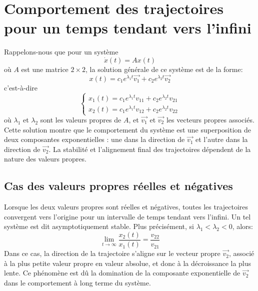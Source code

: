     \section{Comportement des trajectoires pour un temps tendant vers l'infini}
        Rappelons-nous que pour un système
        \begin{equation}
            \dot{x}(t) = A x(t)
        \end{equation}
        où $A$ est une matrice $2 \times 2$, la solution générale de ce système est de la forme: 
        \begin{equation}
            x(t) = c_1 e^{\lambda_1 t} \overrightarrow{v_1} + c_2 e^{\lambda_2 t} \overrightarrow{v_2}
        \end{equation}
        c'est-à-dire
        \begin{equation}
            \begin{cases}
                x_1(t) = c_1 e^{\lambda_1 t} v_{11} + c_2 e^{\lambda_2 t} v_{21} \\
                x_2(t) = c_1 e^{\lambda_1 t} v_{12} + c_2 e^{\lambda_2 t} v_{22}
            \end{cases}
        \end{equation}
        où $\lambda_1$ et $\lambda_2$ sont les valeurs propres de $A$, et $\overrightarrow{v_1}$ et $\overrightarrow{v_2}$ les vecteurs propres associés. Cette solution montre que le comportement du système est une superposition de deux composantes exponentielles : une dans la direction de $\overrightarrow{v_1}$ et l'autre dans la direction de $\overrightarrow{v_2}$. La stabilité et l’alignement final des trajectoires dépendent de la nature des valeurs propres.

        \subsection{Cas des valeurs propres réelles et négatives}
            Lorsque les deux valeurs propres sont réelles et négatives, toutes les trajectoires convergent vers l'origine pour un intervalle de temps tendant vers l'infini. Un tel système est dit asymptotiquement stable. Plus précisément, si $\lambda_1 < \lambda_2 < 0$, alors:
            \begin{equation}
                \lim_{t \to \infty} \frac{x_2(t)}{x_1(t)} = \frac{v_{22}}{v_{21}}
            \end{equation}
            Dans ce cas, la direction de la trajectoire s'aligne sur le vecteur propre $ \overrightarrow{v_2}$, associé à la plus petite valeur propre en valeur absolue, et donc à la décroissance la plus lente. Ce phénomène est dû la domination de la composante exponentielle de $\overrightarrow{v_2}$ dans le comportement à long terme du système.

